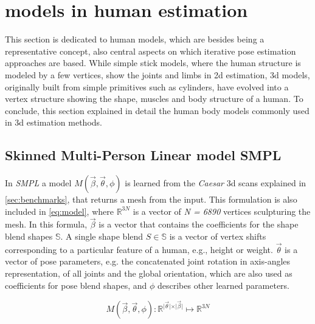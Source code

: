 \section{models in human estimation}
This section is dedicated to human models, which are besides being a representative concept, also central aspects on which iterative pose estimation approaches are based. While simple stick models, where the human structure is modeled by a few vertices, show the joints and limbs in 2d estimation, 3d models, originally built from simple primitives such as cylinders, have evolved into a vertex structure showing the shape, muscles and body structure of a human. To conclude, this section explained in detail the human body models commonly used in 3d estimation methods.

\subsection{Skinned Multi-Person Linear model SMPL}
\label{sec:SMPL}
In \emph{SMPL} \cite{smpl} a model $M(\vec{\beta},\vec{\theta},\phi)$ is learned from the \emph{Caesar} 3d scans explained in \autoref{sec:benchmarks}, that returns a mesh from the input. This formulation is also included in \autoref{eq:model}, where $\mathbb{R}^{3N}$ is a vector of \emph{N = 6890} vertices sculpturing the mesh. In this formula, $\vec{\beta}$ is a vector that contains the coefficients for the shape blend shapes $\mathbb{S}$. 
A single shape blend $S \in \mathbb{S}$ is a vector of vertex shifts corresponding to a particular feature of a human, e.g., height or weight. $\vec{\theta}$ is a vector of pose parameters, e.g. the concatenated joint rotation in axis-angles representation, of all joints and the global orientation, which are also used as coefficients for pose blend shapes, and $\phi$ describes other learned parameters. 

\begin{equation}
\label{eq:model}
M(\vec{\beta},\vec{\theta},\phi) : \mathbb{R}^{\vert \vec{\theta} \vert \times \vert \vec{\beta} \vert} \mapsto \mathbb{R}^{3N}
\end{equation}

